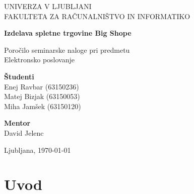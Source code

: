 \documentclass[a4paper,12pt]{report}
\newcommand{\naslov}     {Izdelava spletne trgovine Big Shope}
\newcommand{\prviavtor}  {Enej Ravbar}
\newcommand{\prviindeks} {63150236}
\newcommand{\drugiavtor} {Matej Bizjak}
\newcommand{\drugiindeks}{63150053}
\newcommand{\tretjiavtor} {Miha Jamšek}
\newcommand{\tretjiindeks}{63150120}
\newcommand{\kraj}       {Ljubljana}
\begin{document}
\begin{titlepage}
	\begin{center}
	{UNIVERZA V LJUBLJANI\\[10pt] 
	FAKULTETA ZA RAČUNALNIŠTVO IN INFORMATIKO}

	\vspace{65mm}

	{\Large\textbf{\naslov}}

	\vspace{10mm}

	{\large Poročilo seminarske naloge pri predmetu\\[10pt] Elektronsko poslovanje}

	\vfill
	\vspace{60mm}

\hspace{20mm}
\begin{minipage}[t]{70mm}
	{\bf Študenti}\\
	{\prviavtor} ({\prviindeks})\\ 
	{\drugiavtor} ({\drugiindeks})\\
	{\tretjiavtor} ({\tretjiindeks})
\end{minipage}
\begin{minipage}[t]{50mm}
	{\bf Mentor}\\
	David Jelenc
\end{minipage}

	\vspace{35mm}

	{	\kraj, \today}
	\end{center}
\end{titlepage}


\tableofcontents


\chapter{Uvod}
\end{document}
